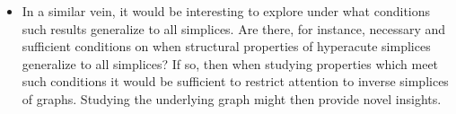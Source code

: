 \begin{itemize}
	\item In  a  similar vein, it would be interesting to explore under what conditions  such results generalize  to all simplices. Are there, for instance, necessary and sufficient conditions on when structural  properties of hyperacute simplices  generalize to  all simplices? If so, then when studying properties which  meet  such conditions it would be sufficient  to restrict attention to inverse simplices of  graphs. Studying the underlying graph  might then provide  novel insights. 

\end{itemize}

